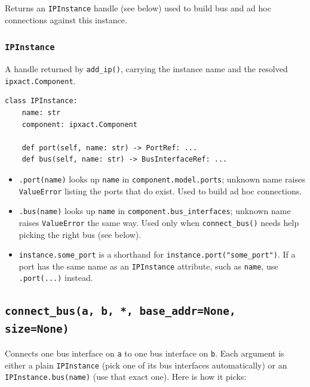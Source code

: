 \documentclass[11pt]{article}
\newcommand{\code}[1]{\texttt{#1}}
\begin{document}
Returns an \code{IPInstance} handle (see below) used to build bus and ad hoc connections
against this instance.

\subsubsection{\texttt{IPInstance}}

A handle returned by \code{add\_ip()}, carrying the instance name and the resolved
\code{ipxact.Component}.

\begin{lstlisting}[style=pyblock, caption={The \texttt{IPInstance} handle.}]
class IPInstance:
    name: str
    component: ipxact.Component

    def port(self, name: str) -> PortRef: ...
    def bus(self, name: str) -> BusInterfaceRef: ...
\end{lstlisting}

\begin{itemize}
    \item \code{.port(name)} looks up \code{name} in \code{component.model.ports};
    unknown name raises \code{ValueError} listing the ports that do exist. Used to build
    ad hoc connections.
    \item \code{.bus(name)} looks up \code{name} in \code{component.bus\_interfaces};
    unknown name raises \code{ValueError} the same way. Used only when
    \code{connect\_bus()} needs help picking the right bus (see below).
    \item \code{instance.some\_port} is a shorthand for \code{instance.port("some\_port")}.
    If a port has the same name as an \code{IPInstance} attribute, such as \code{name},
    use \code{.port(...)} instead.
\end{itemize}

\subsection{\texttt{connect\_bus(a, b, *, base\_addr=None, size=None)}}

Connects one bus interface on \code{a} to one bus interface on \code{b}. Each argument is
either a plain \code{IPInstance} (pick one of its bus interfaces automatically) or an
\code{IPInstance.bus(name)} (use that exact one). Here is how it picks:
\end{document}
